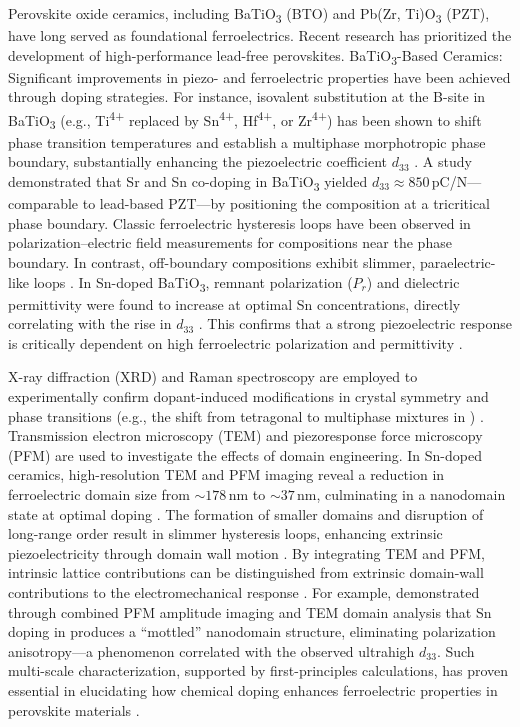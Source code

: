 \documentclass[a4paper,fleqn]{cas-sc}
\begin{document}
\par Perovskite oxide ceramics, including BaTiO\textsubscript{3} (BTO) and Pb(Zr, Ti)O\textsubscript{3} (PZT), have long served as foundational ferroelectrics. Recent research has prioritized the development of high-performance lead-free perovskites. BaTiO\textsubscript{3}-Based Ceramics: Significant improvements in piezo- and ferroelectric properties have been achieved through doping strategies. For instance, isovalent substitution at the B-site in BaTiO\textsubscript{3} (e.g., Ti\textsuperscript{4+} replaced by Sn\textsuperscript{4+}, Hf\textsuperscript{4+}, or Zr\textsuperscript{4+}) has been shown to shift phase transition temperatures and establish a multiphase morphotropic phase boundary, substantially enhancing the piezoelectric coefficient \(d_{33}\) \cite{wu2024origin}. A study \cite{wu2024origin} demonstrated that Sr and Sn co-doping in BaTiO\textsubscript{3} yielded \(d_{33} \approx 850\)\,pC/N---comparable to lead-based PZT---by positioning the composition at a tricritical phase boundary. Classic ferroelectric hysteresis loops have been observed in polarization--electric field measurements for compositions near the phase boundary. In contrast, off-boundary compositions exhibit slimmer, paraelectric-like loops \cite{wu2024origin}. In Sn-doped BaTiO\textsubscript{3}, remnant polarization (\(P_r\)) and dielectric permittivity were found to increase at optimal Sn concentrations, directly correlating with the rise in \(d_{33}\) \cite{wu2024origin}. This confirms that a strong piezoelectric response is critically dependent on high ferroelectric polarization and permittivity \cite{wu2024origin}.
\par X-ray diffraction (XRD) and Raman spectroscopy are employed to experimentally confirm dopant-induced modifications in crystal symmetry and phase transitions (e.g., the shift from tetragonal to multiphase mixtures in ) \cite{wu2024origin}. Transmission electron microscopy (TEM) and piezoresponse force microscopy (PFM) are used to investigate the effects of domain engineering. In Sn-doped  ceramics, high-resolution TEM and PFM imaging reveal a reduction in ferroelectric domain size from $\sim\!178\,\mathrm{nm}$ to $\sim\!37\,\mathrm{nm}$, culminating in a nanodomain state at optimal doping \cite{wu2024origin}. The formation of smaller domains and disruption of long-range order result in slimmer hysteresis loops, enhancing extrinsic piezoelectricity through domain wall motion \cite{wu2024origin}. By integrating TEM and PFM, intrinsic lattice contributions can be distinguished from extrinsic domain-wall contributions to the electromechanical response \cite{wu2024origin}. For example,  \cite{wu2024origin} demonstrated through combined PFM amplitude imaging and TEM domain analysis that Sn doping in  produces a ``mottled'' nanodomain structure, eliminating polarization anisotropy---a phenomenon correlated with the observed ultrahigh $d_{33}$. Such multi-scale characterization, supported by first-principles calculations, has proven essential in elucidating how chemical doping enhances ferroelectric properties in perovskite materials \cite{wu2024origin}.
\end{document}
